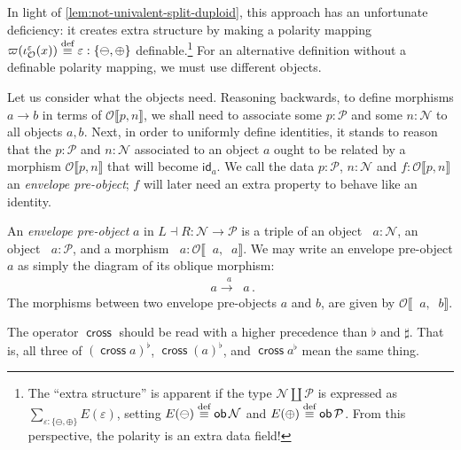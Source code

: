 \documentclass[runningheads]{llncs}
\newcommand*\rocqlogo{\usebox{\rocqlogobox}}
\newcommand{\lemmaref}[3]{\href{https://github.com/UniMath/UniMath/blob/94fae0eda57a778cec704bfa73b4ff525c9bc475/#1\#L#2?name=#3}{\rocqlogo}}
\newcommand{\acat}[1]{\mathcal{#1}}
\newcommand{\PP}{\acat{P}}
\newcommand{\NN}{\acat{N}}
\newcommand{\OO}{\acat{O}}
\newcommand{\EE}{\acat{E}}
\DeclareMathOperator{\ob}{\mathsf{ob}}
\newcommand{\id}{\mathsf{id}}
\newcommand{\morsof}[3]{{#1}\llbracket{#2},{#3}\rrbracket}
\newcommand{\defequiv}{\overset{\mathrm{\textup{def}}}{\equiv}}
\newcommand{\projneg}{\mathop{\pi^{\ominus}}}
\newcommand{\projpos}{\mathop{\pi^{\oplus}}}
\newcommand{\crossmor}{\mathop{\mathsf{cross}}}
\newcommand{\projnegE}{\mathop{\pi^{\ominus}_{\EE}}}
\newcommand{\projposE}{\mathop{\pi^{\oplus}_{\EE}}}
\newcommand{\crossmorE}{\mathop{\mathsf{cross}_{\EE}}}
\begin{document}
In light of \autoref{lem:not-univalent-split-duploid}, this approach has an
unfortunate deficiency: it creates extra structure by making a
polarity mapping \(\varpi(\iota^{\varepsilon}_{\OO}(x)) \defequiv
\varepsilon : \{\ominus, \oplus\}\) definable.\footnote{The ``extra structure'' is apparent if the type \(\NN \amalg
\PP\) is expressed as \(\sum_{\varepsilon : \{\ominus,
\oplus\}}E(\varepsilon)\), setting \(E(\ominus) \defequiv \ob\NN\) and
\(E(\oplus) \defequiv \ob\PP\). From this perspective, the polarity is
an extra data field!} For an
alternative definition without a definable polarity mapping, we must
use different objects.

Let us consider what the objects need. Reasoning backwards, to define
morphisms \(a \to b\) in terms of \(\morsof\OO{p}{n}\), we shall need
to associate some \(p : \PP\) and some \(n : \NN\) to all objects
\(a,b\). Next, in order to uniformly define identities, it stands to
reason that the \(p : \PP\) and \(n : \NN\) associated to an object
\(a\) ought to be related by a morphism \(\morsof\OO{p}{n}\) that will
become \(\id_a\). We call the data \(p : \PP\), \(n : \NN\) and \(f :
\morsof\OO{p}{n}\) an \emph{envelope pre\hyp{}object}; \(f\) will later need an
extra property to behave like an identity.

\begin{definition}[{\lemmaref{UniMath/CategoryTheory/Nonassociative/Duploids/FromAdjunction/Envelope.v}{56}{envelope\_preob}}]
\label{def:envelope-preob}
An \emph{envelope pre\hyp{}object} \(a\) in \(L \dashv R : \NN \to \PP\) is a triple of an object
\(\projnegE{a} : \NN\), an object \(\projposE{a} : \PP\), and a
morphism \(\crossmorE{a} :
\morsof\OO{\projpos{a}}{\projneg{a}}\). We may write an envelope pre\hyp{}object \(a\) as simply the diagram of
its oblique morphism:
\begin{align*}
\projposE{a} \xrightarrow{\crossmorE{a}} \projnegE{a}\mathpunct.
\end{align*}
The morphisms between two envelope pre\hyp{}objects \(a\) and \(b\), are
given by \(\morsof\OO{\projposE{a}}{\projnegE{b}}\).
\end{definition}
\begin{notation}
The operator \(\crossmor\) should be read with a higher precedence
than \(\flat\) and \(\sharp\). That is, all three of \((\crossmor
a)^\flat\), \(\crossmor(a)^\flat\), and \(\crossmor a^\flat\) mean the
same thing.
\end{notation}
\end{document}
